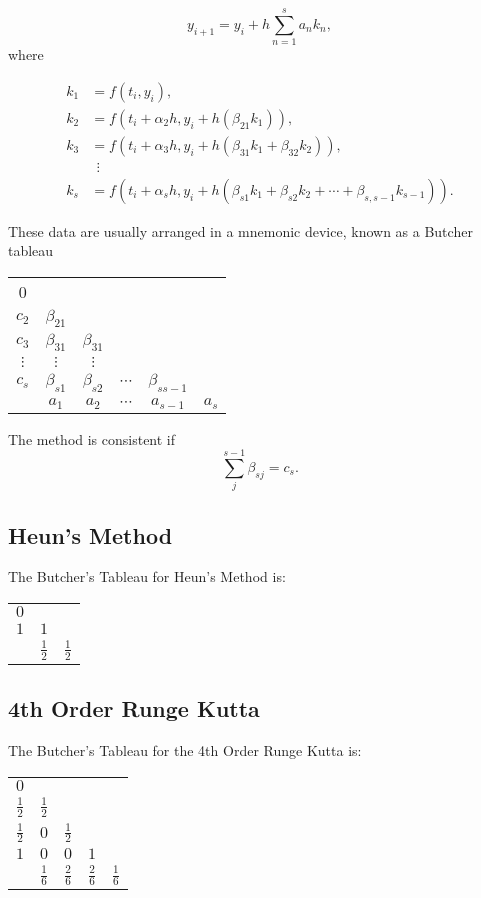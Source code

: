 \[ y_{i+1}=y_{i}+h\sum _{n=1}^{s}a_{n}k_{n},\] 
where

\[ {\begin{aligned}k_{1}&=f(t_{i},y_{i}),\\k_{2}&=f(t_{i}+\alpha_{2}h,y_{i}+h(\beta_{21}k_{1})),\\k_{3}&=f(t_{i}+\alpha_{3}h,y_{i}+h(\beta_{31}k_{1}+\beta_{32}k_{2})),\\&\ \ \vdots \\k_{s}&=f(t_{i}+\alpha_{s}h,y_{i}+h(\beta_{s1}k_{1}+\beta_{s2}k_{2}+\cdots +\beta_{s,s-1}k_{s-1})).\end{aligned}}\] 

These data are usually arranged in a mnemonic device, known as a Butcher tableau
\begin{center}
 \begin{tabular}{c| c c c c c} 
 0&  &  & & & \\ 
 $c_2$& $\beta_{21}$ &  & & & \\ 
 $c_3$& $\beta_{31}$ & $\beta_{31}$ & & & \\ 
 $\vdots $& $\vdots$ & $\vdots$  & & & \\ 
 
 $c_s$& $\beta_{s1}$ & $\beta_{s2}$ & $\cdots$& $\beta_{ss-1}$ & \\ 
 \hline
 & $a_{1}$  & $a_{2}$ & $\cdots$ &$a_{s-1}$ & $a_s$ \\ 
\end{tabular}
\end{center}
The method is consistent if 
\[\sum_{j}^{s-1} \beta_{sj}=c_s.\]
\subsection{Heun's Method}
The Butcher's Tableau for Heun's Method is:
\begin{center}
 \begin{tabular}{c| c c} 
 $0$&    &   \\ 
 $1$& $1$ &   \\ 
 \hline
 & $\frac{1}{2}$  & $\frac{1}{2}$   \\ 
\end{tabular}
\end{center}
\subsection{4th Order Runge Kutta}
The Butcher's Tableau for the 4th Order Runge Kutta is:
\begin{center}
 \begin{tabular}{c| c c c c} 
 $0$&    &  & & \\ 
 $\frac{1}{2}$& $\frac{1}{2}$ &  & & \\ 
 $\frac{1}{2}$& $0$ & $\frac{1}{2}$ & &  \\ 
 $1 $& $0$ & $0$  &$1$ &  \\ 
 \hline
 & $\frac{1}{6}$  & $\frac{2}{6}$ & $\frac{2}{6}$ &$\frac{1}{6}$  \\ 
\end{tabular}
\end{center}

